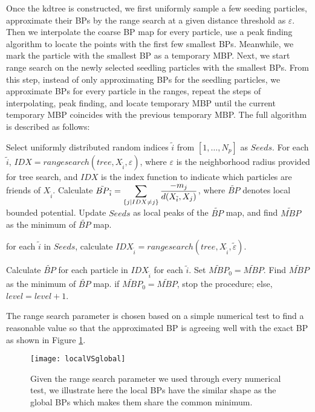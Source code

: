 Once the kdtree is constructed, we first uniformly sample a few seeding particles, approximate their BPs by the range search at a given distance threshold as $\varepsilon$. Then we interpolate the coarse BP map for every particle, use a peak finding algorithm to locate the points with the first few smallest BPs. Meanwhile, we mark the particle with the smallest BP as a temporary MBP. Next, we start range search on the newly selected seedling particles with the smallest BPs. From this step, instead of only approximating BPs for the seedling particles, we approximate BPs for every particle in the ranges, repeat the steps of interpolating, peak finding, and locate temporary MBP until the current temporary MBP coincides with the previous temporary MBP. The full algorithm is described as follows: 
\begin{algorithmic}[h]
\State Select uniformly distributed random indices $\tilde{i}$ from $[1,\dots,N_p]$ as $Seeds$.
\State For each $\tilde{i}$, $IDX=rangesearch(tree,X_{\tilde{i}},\varepsilon)$, where $\varepsilon$ is the neighborhood radius provided for tree search, and $IDX$ is the index function to indicate which particles are friends of $X_{\tilde{i}}$. Calculate $\tilde{BP}_{\tilde{i}}=\displaystyle\sum_{\{j|IDX\neq j\}}\frac{-m_j}{d(X_{\tilde{i}},X_j)}$, where $\tilde{BP}$ denotes local bounded potential. 
\State Update $Seeds$ as local peaks of the $\tilde{BP}$ map, and find $\tilde{MBP}$ as the minimum of $\tilde{BP}$ map. 


\State for each $\tilde{i}$ in $Seeds$, calculate $IDX_{\tilde{i}}=rangesearch(tree,X_{\tilde{i}},\tilde{\varepsilon})$.

\State Calculate $\tilde{BP}$ for each particle in $IDX_{\tilde{i}}$ for each $\tilde{i}$.
\State Set $\tilde{MBP}_0=\tilde{MBP}$.
\State Find $\tilde{MBP}$ as the minimum of $\tilde{BP}$ map. 
\State if $\tilde{MBP}_0=\tilde{MBP}$, stop the procedure; else, $level=level+1$.
\EndProcedure
\end{algorithmic} 

The range search parameter is chosen based on a simple numerical test to find a reasonable value so that the approximated BP is agreeing well with the exact BP as shown in Figure \ref{rsthreshold}.

\begin{figure}[ht]
\centering
    \texttt{[image: localVSglobal]}
    \caption{Given the range search parameter we used through every numerical test,  we illustrate here the local BPs have the similar shape as the global BPs which makes them share the common minimum.}
    \label{rsthreshold}
\end{figure}


